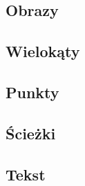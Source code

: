 \subsection{Obrazy}


\subsection{Wielokąty}


\subsection{Punkty}


\subsection{Ścieżki}


\subsection{Tekst}
